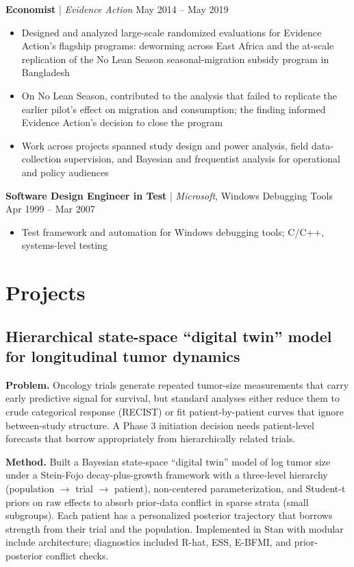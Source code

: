 \documentclass[11pt]{article}
\begin{document}
\medskip

\textbf{Economist} | \textit{Evidence Action} \hfill May 2014 -- May 2019
\begin{itemize}
  \item Designed and analyzed large-scale randomized evaluations for Evidence Action's flagship programs: deworming across East Africa and the at-scale replication of the No Lean Season seasonal-migration subsidy program in Bangladesh
  \item On No Lean Season, contributed to the analysis that failed to replicate the earlier pilot's effect on migration and consumption; the finding informed Evidence Action's decision to close the program
  \item Work across projects spanned study design and power analysis, field data-collection supervision, and Bayesian and frequentist analysis for operational and policy audiences
\end{itemize}

\medskip

\textbf{Software Design Engineer in Test} | \textit{Microsoft}, Windows Debugging Tools \hfill Apr 1999 -- Mar 2007
\begin{itemize}
  \item Test framework and automation for Windows debugging tools; C/C++, systems-level testing
\end{itemize}

\section*{Projects}

\subsection*{Hierarchical state-space ``digital twin'' model for longitudinal tumor dynamics}

\textbf{Problem.} Oncology trials generate repeated tumor-size measurements that carry early predictive signal for survival, but standard analyses either reduce them to crude categorical response (RECIST) or fit patient-by-patient curves that ignore between-study structure. A Phase 3 initiation decision needs patient-level forecasts that borrow appropriately from hierarchically related trials.

\textbf{Method.} Built a Bayesian state-space ``digital twin'' model of log tumor size under a Stein-Fojo decay-plus-growth framework with a three-level hierarchy (population $\to$ trial $\to$ patient), non-centered parameterization, and Student-t priors on raw effects to absorb prior-data conflict in sparse strata (small subgroups). Each patient has a personalized posterior trajectory that borrows strength from their trial and the population. Implemented in Stan with modular include architecture; diagnostics included R-hat, ESS, E-BFMI, and prior-posterior conflict checks.
\end{document}
